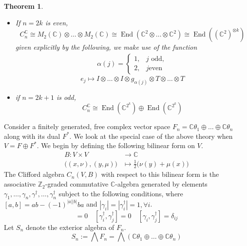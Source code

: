 \documentclass[12pt]{article}
\theoremstyle{plain}
\newtheorem{thm}{Theorem}[subsection] %
\theoremstyle{definition}
\newcommand{\bb}[1]{\mathbb{#1}}
\newcommand{\lto}{\longrightarrow}
\begin{document}
\begin{thm}\label{thm:structure_clifford}
	\begin{itemize} There is the following decomposition:
		\item If $n = 2k$ is even,
		\begin{equation}
			C_n^{\bb{C}} \cong M_2(\bb{C}) \otimes \hdots \otimes M_2(\bb{C}) \cong \operatorname{End}(\bb{C}^2 \otimes \hdots \otimes \bb{C}^2) \cong \operatorname{End}((\bb{C}^{2})^{\otimes k})
		\end{equation}
		given explicitly by the following, we make use of the function
		\begin{align*}
			\alpha(j) = \begin{cases}
				1,& j\text{ odd},\\
				2, & j\text{even}
			\end{cases}
		\end{align*}
		\begin{equation}
			e_j \longmapsto I \otimes \hdots \otimes I \otimes g_{\alpha(j)} \otimes T \otimes \hdots \otimes T
		\end{equation}
		\item if $n = 2k+1$ is odd,
		\begin{equation}
			C_n^{\bb{C}} \cong \operatorname{End}(\bb{C}^{2^k}) \oplus \operatorname{End}(\bb{C}^{2^k})
		\end{equation}
	\end{itemize}
\end{thm}
Consider a finitely generated, free complex vector space $F_n = \bb{C}\theta_1 \oplus \ldots \oplus \bb{C}\theta_n$ along with its dual $F^\ast$. We look at the special case of the above theory when $V = F \oplus F^\ast$. We begin by defining the following bilinear form on $V$.
\begin{align*}
	B: V \times V &\lto \bb{C}\\
	\big((x, \nu), (y, \mu)\big) &\longmapsto \frac{1}{2}\big(\nu(y) + \mu(x)\big)
\end{align*}
The Clifford algebra $C_n(V, B)$ with respect to this bilinear form is the associative $\bb{Z}_2$-graded commutative $\bb{C}$-algebra generated by elements $\gamma_1, \ldots, \gamma_n, \gamma^\dagger, \ldots, \gamma_n^\dagger$ subject to the following conditions, where $[a,b] = ab - (-1)^{|a| |b|}ba$ and $|\gamma_i| = |\gamma_i^\dagger| = 1,\forall i$.
\begin{equation}
	[\gamma_i, \gamma_j] = 0\quad [\gamma_i^\dagger, \gamma_j^\dagger] = 0\quad [\gamma_i, \gamma_j^\dagger] = \delta_{ij}
\end{equation}
Let $S_n$ denote the exterior algebra of $F_n$.
\begin{equation}
	S_n := \bigwedge F_n = \bigwedge (\bb{C}\theta_1 \oplus \ldots \oplus \bb{C}\theta_n)
\end{equation}
\end{document}
